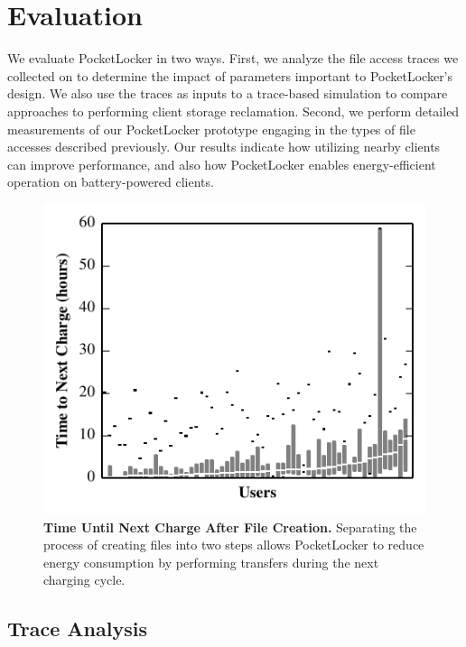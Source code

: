 
\section{Evaluation}
\label{sec-evaluation}
We evaluate PocketLocker in two ways. First, we analyze the file access
traces we collected on \PhoneLab{} to determine the impact of parameters
important to PocketLocker's design. We also use the traces as inputs to a
trace-based simulation to compare approaches to performing client storage
reclamation. Second, we perform detailed measurements of our PocketLocker
prototype engaging in the types of file accesses described previously.
Our results indicate how utilizing nearby clients can improve performance, and
also how PocketLocker enables energy-efficient operation on battery-powered
clients.

\begin{figure}[t]
  \includegraphics{./figures/pocketlocker/BatteryLengthDistributionGraph.pdf}
  
  \caption{\small \textbf{Time Until Next Charge After File Creation.}
    Separating the process of creating files into two steps allows
  PocketLocker to reduce energy consumption by performing transfers during
the next charging cycle.}
  
  \label{fig-simulation-battery}

  \vspace*{-0.3in}
\end{figure}
\subsection{Trace Analysis}
\label{subsec-evaluation-traces}

